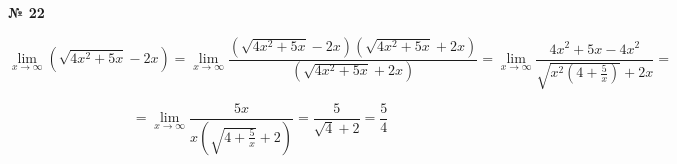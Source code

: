 \documentclass{article}
\begin{document}
\textbf{№ 22} 
\large

$$ \lim\limits_{x \to \infty} \left( \sqrt{4x^2+5x} - 2x \right)
= \lim\limits_{x \to \infty} \frac{\left( \sqrt{4x^2+5x} - 2x \right) \left( \sqrt{4x^2+5x} + 2x \right)}{\left( \sqrt{4x^2+5x} + 2x \right)}
= \lim\limits_{x \to \infty} \frac{ 4x^2+5x - 4x^2 }{\sqrt{x^2(4+\frac{5}{x})} + 2x}
= $$  

$$ = \lim\limits_{x \to \infty} \frac{5x}{x(\sqrt{4+\frac{5}{x}} + 2)}
= \frac{5}{\sqrt{4}+2}
= \frac{5}{4} $$
\end{document}
